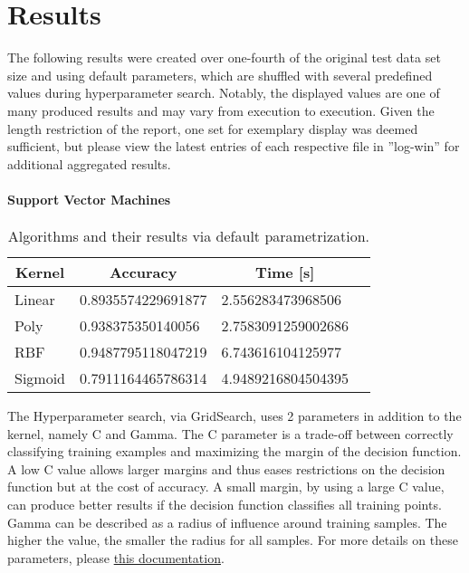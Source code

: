 \chapter{Results}
The following results were created over one-fourth of the original test data set size and using default parameters, which are shuffled with several predefined values during hyperparameter search.
Notably, the displayed values are one of many produced results and may vary from execution to execution. 
Given the length restriction of the report, one set for exemplary display was deemed sufficient, but please view the latest entries of each respective file in ''log-win'' for additional aggregated results.

\subsubsection{Support Vector Machines}
\begin{table}[H]
    \centering
    \begin{tabular}{|l|l|l|l|}\hline
        \multicolumn{1}{|c|}{Kernel} & \multicolumn{1}{|c|}{Accuracy} & \multicolumn{1}{|c|}{Time [s]} \\\hline
        Linear  & 0.8935574229691877    & 2.556283473968506\\
        Poly    & 0.938375350140056     & 2.7583091259002686\\
        RBF     & 0.9487795118047219    & 6.743616104125977\\
        Sigmoid & 0.7911164465786314    & 4.9489216804504395\\\hline
    \end{tabular}
    \caption{Algorithms and their results via default parametrization.}
    \label{tab:svm_results_fit}
\end{table}

The Hyperparameter search, via GridSearch, uses 2 parameters in addition to the kernel, namely C and Gamma.
The C parameter is a trade-off between correctly classifying training examples and maximizing the margin of the decision function. A low C value allows larger margins and thus eases restrictions on the decision function but at the cost of accuracy. A small margin, by using a large C value, can produce better results if the decision function classifies all training points.
Gamma can be described as a radius of influence around training samples. The higher the value, the smaller the radius for all samples. 
For more details on these parameters, please \href{https://scikit-learn.org/stable/auto_examples/svm/plot_rbf_parameters.html}{this documentation}.

